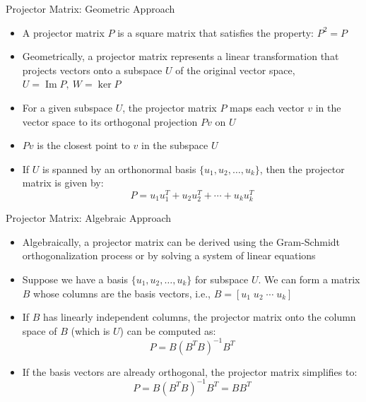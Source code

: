 \documentclass[fullscreen=true, bookmarks=true, hyperref={pdfencoding=unicode}]{beamer}
\begin{document}
\begin{frame}{Projector Matrix: Geometric Approach}
  \begin{itemize}
    \item A projector matrix $P$ is a square matrix that satisfies the property: $P^2 = P$
    \item Geometrically, a projector matrix represents a linear transformation 
    that projects vectors onto a subspace $U$ of the original vector space, 
    $U = \operatorname{Im}P,\ W=\operatorname{ker}P$
    \item For a given subspace $U$, the projector matrix $P$ maps each vector $v$ 
    in the vector space to its orthogonal projection $Pv$ on $U$
    \pause
    \item $Pv$ is the closest point to $v$ in the subspace $U$
    \pause
    \item If $U$ is spanned by an orthonormal basis $\{u_1, u_2, \dots, u_k\}$, 
    then the projector matrix is given by:
      \[P = u_1u_1^T + u_2u_2^T + \cdots + u_ku_k^T\]
  \end{itemize}

\end{frame}

  
\begin{frame}{Projector Matrix: Algebraic Approach}
  \begin{itemize}
    \item Algebraically, a projector matrix can be derived using the Gram-Schmidt orthogonalization process or by solving a system of linear equations
    \item Suppose we have a basis $\{u_1, u_2, \dots, u_k\}$ for subspace $U$. 
    We can form a matrix $B$ whose columns are the basis vectors, i.e., $B = [u_1 \; u_2 \; \cdots \; u_k]$
    \item If $B$ has linearly independent columns, the projector matrix onto 
    the column space of $B$ (which is $U$) can be computed as:
      \[P = B(B^TB)^{-1}B^T\]
    \item If the basis vectors are already orthogonal, the projector matrix simplifies to:
      \[P = B(B^TB)^{-1}B^T = BB^T\]
  \end{itemize}
\end{frame}
\end{document}
